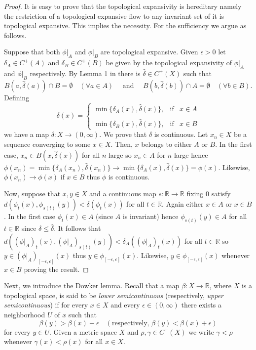 \documentclass[11pt,letterpaper]{amsart}
\begin{document}
\begin{proof}
It is easy to prove that the topological expansivity is hereditary namely
the restriction of a topological expansive flow to any invariant set of it is topological expansive.
This implies the necessity.
For the sufficiency we argue as follows.

Suppose that both $\phi|_A$ and $\phi|_B$ are topological expansive.
Given $\epsilon>0$ let $\delta_A\in C^+(A)$ and $\delta_B\in C^+(B)$ be given by the topological expansivity of $\phi|_A$ and $\phi|_B$ respectively.
By Lemma 1 in \cite{h} there is $\hat{\delta}\in C^+(X)$ such that
$$
B(a,\hat{\delta}(a))\cap B=\emptyset \quad(\forall a\in A)\quad\mbox{ and }\quad B(b,\hat{\delta}(b))\cap A=\emptyset\quad (\forall b\in B).
$$
Defining
$$
\delta(x) = \left\{
\begin{array}{rcl}
\min\{\delta_A(x),\hat{\delta}(x)\}, & \mbox{if} & x\in A\\
& & \\
\min\{\delta_B(x),\hat{\delta}(x)\},& \mbox{if} & x\in B
\end{array}
\right.
$$
we have a map $\delta:X\to (0,\infty)$.
We prove that $\delta$ is continuous.
Let $x_n\in X$ be a sequence converging to some $x\in X$.
Then, $x$ belongs to either $A$ or $B$. In the first case,
$x_n\in B(x,\hat{\delta}(x))$ for all $n$ large so $x_n\in A$ for $n$ large
hence
$\phi(x_n)=\min\{\delta_A(x_n),\hat{\delta}(x_n)\}\to\min\{\delta_A(x),\hat{\delta}(x)\}=\phi(x)$.
Likewise, $\phi(x_n)\to\phi(x)$ if $x\in B$ thus $\phi$ is continuous.

Now, suppose that $x,y\in X$ and a continuous map $s:\mathbb{R}\to\mathbb{R}$ fixing $0$ satisfy
$d(\phi_t(x),\phi_{s(t)}(y))<\delta(\phi_t(x))$ for all $t\in\mathbb{R}$.
Again either $x\in A$ or $x\in B$.
In the first case $\phi_t(x)\in A$ (since $A$ is invariant) hence
$\phi_{s(t)}(y)\in A$ for all $t\in\mathbb{R}$
since $\delta\leq\hat{\delta}$. It follows that
$d((\phi|_A)_t(x),(\phi|_A)_{s(t)}(y))<\delta_A((\phi|_A)_t(x))$ for all $t\in\mathbb{R}$ so $y\in (\phi|_A)_{[-\epsilon,\epsilon]}(x)$ thus
$y\in \phi_{[-\epsilon,\epsilon]}(x)$. Likewise, $y\in \phi_{[-\epsilon,\epsilon]}(x)$ whenever $x\in B$ proving the result.
\end{proof}









Next, we introduce the Dowker lemma.
Recall that a map $\beta:X\to\mathbb{R}$,
where \(X\) is a topological space, is said to be \emph{lower semicontinuous} (respectively, \emph{upper semicontinuous}) if for every \(x\in X\) and every \(\epsilon\in (0,\infty)\) there exists a neighborhood \(U\) of \(x\) such that 
\[
\beta(y)>\beta(x)-\epsilon \quad (\text{respectively, } \beta(y)<\beta(x)+\epsilon)
\]
for every \(y\in U\). Given a metric space $X$ and \(\rho, \gamma\in C^+(X)\) we write  
\(\gamma < \rho\) whenever \(\gamma(x) < \rho(x)\) for all \(x \in X\).
\end{document}
